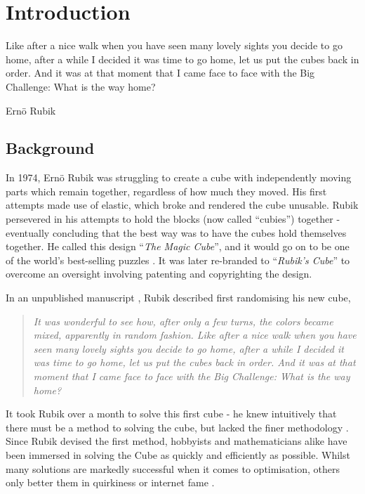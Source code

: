 \documentclass{report}
\newcommand{\tit}[1]{\textit{#1}}
\newcommand{\propernoun}[1]{\enquote{\tit{#1}}}
\begin{document}
	\tableofcontents
   	\listoffigures
	\listoftables

	\renewcommand{\thechapter}{\arabic{chapter}}
	\setcounter{chapter}{0}
	\chapter{Introduction}
	\epigraph{Like after a nice walk when you have seen many lovely sights you decide to go home, after a while I decided it was time to go home, let us put the cubes back in order. And it was at that moment that I came face to face with the Big Challenge: What is the way home?}{Ern\"{o} Rubik \cite{Rubik1986}}
	
    \section{Background}

    In 1974, Ern\"{o} Rubik was struggling to create a cube with independently moving parts which remain together, regardless of how much they moved. His first attempts made use of elastic, which broke and rendered the cube unusable. Rubik persevered in his attempts to hold the blocks (now called \enquote{cubies}) together - eventually concluding that the best way was to have the cubes hold themselves together. He called this design \propernoun{The Magic Cube}, and it would go on to be one of the world's best-selling puzzles \cite{Waxman2014}. It was later re-branded to \propernoun{Rubik's Cube} to overcome an oversight involving patenting and copyrighting  the design.
    
    In an unpublished manuscript \cite{Rubik1986}, Rubik described first randomising his new cube, 
    
    \blockquote{\tit{It was wonderful to see how, after only a few turns, the colors became mixed, apparently in random fashion. Like after a nice walk when you have seen many lovely sights you decide to go home, after a while I decided it was time to go home, let us put the cubes back in order. And it was at that moment that I came face to face with the Big Challenge: What is the way home?}}
    
    It took Rubik over a month to solve this first cube - he knew intuitively that there must be a method to solving the cube, but lacked the finer methodology \cite{RubiksCube2017}. Since Rubik devised the first method, hobbyists and mathematicians alike have been immersed in solving the Cube as quickly and efficiently as possible. Whilst many solutions are markedly successful when it comes to optimisation, others only better them in quirkiness or internet fame \cite{Chan2016}.
    
\end{document}

